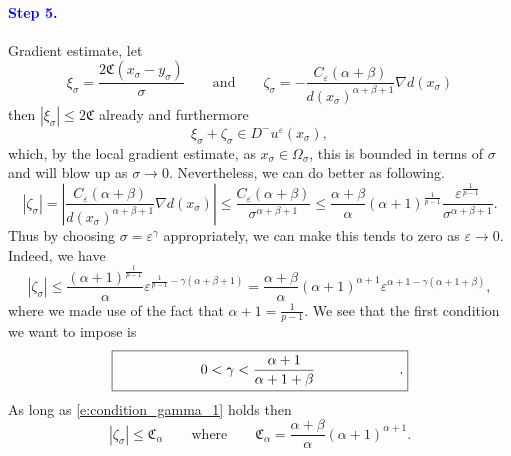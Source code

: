 \documentclass[11pt,reqno]{amsart}
\numberwithin{figure}{section}
\theoremstyle{plain}
\theoremstyle{remark}
\numberwithin{equation}{section}
\begin{document}
\paragraph{\textcolor{blue}{\textbf{Step 5.}}} Gradient estimate, let
\begin{equation*}
    \xi_\sigma = \frac{2\mathfrak{C}(x_\sigma-y_\sigma)}{\sigma} \qquad\text{and}\qquad \zeta_\sigma = - \frac{C_\varepsilon(\alpha+\beta)}{d(x_\sigma)^{\alpha+\beta+1}}\nabla d(x_\sigma)
\end{equation*}
then $|\xi_\sigma|\leq 2\mathfrak{C}$ already and furthermore
\begin{equation*}
   \xi_\sigma+\zeta_\sigma \in D^-u^\varepsilon(x_\sigma),
\end{equation*}
which, by the local gradient estimate, as $x_\sigma\in \Omega_{\sigma}$, this is bounded in terms of $\sigma$ and will blow up as $\sigma\to 0$. Nevertheless, we can do better as following.
\begin{equation*}
 |\zeta_\sigma|=   \left|\frac{C_\varepsilon(\alpha+\beta)}{d(x_\sigma)^{\alpha+\beta+1}}\nabla d(x_\sigma )\right| \leq \frac{C_\varepsilon(\alpha+\beta)}{\sigma^{\alpha+\beta+1}}\leq \frac{\alpha+\beta}{\alpha} (\alpha+1)^\frac{1}{p-1}\frac{\varepsilon^\frac{1}{p-1}}{\sigma^{\alpha+\beta+1}}.
\end{equation*}
Thus by choosing $\sigma = \varepsilon^\gamma$ appropriately, we can make this tends to zero as $\varepsilon \to 0$. Indeed, we have
\begin{equation*}
    |\zeta_\sigma| \leq \frac{(\alpha+1)^\frac{1}{p-1}}{\alpha} \varepsilon^{\frac{1}{p-1} - \gamma(\alpha+\beta+1)} = \frac{\alpha+\beta}{\alpha}(\alpha+1)^{\alpha+1}\varepsilon^{\alpha+1 - \gamma(\alpha+1+\beta)},
\end{equation*}
where we made use of the fact that $\alpha+1 = \frac{1}{p-1}$. We see that the first condition we want to impose is
\begin{equation}\label{e:condition_gamma_1}
    \fbox{\qquad\qquad\qquad$\displaystyle 0 < \gamma < \frac{\alpha+1}{\alpha+1+\beta}$\qquad\qquad\qquad.}
\end{equation}
As long as \eqref{e:condition_gamma_1} holds then
\begin{equation}\label{e:bddp_sigmaq_sigma}
    |\zeta_\sigma|\leq \mathfrak{C}_\alpha \qquad\text{where}\qquad \mathfrak{C}_\alpha = \frac{\alpha+\beta}{\alpha}(\alpha+1)^{\alpha+1}.
\end{equation}
\end{document}
